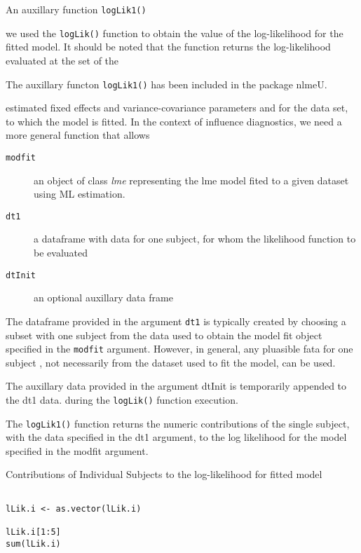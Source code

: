 \documentclass[a4paper,12pt]{article}
\begin{document}
An auxillary function \texttt{logLik1()}

we used the \texttt{logLik()} function to obtain the value of the log-likelihood for the fitted model.
It should be noted that the function returns the log-likelihood evaluated at the set of the


The auxillary functon \texttt{logLik1()} has been included in the package nlmeU.

estimated fixed effects and variance-covariance parameters and for the data set, to which the model
is fitted. In the context of influence diagnostics, we need a more general function that allows




\begin{description}
\item[ \texttt{modfit} ] an object of class \textit{lme} representing the lme model fited to a given dataset using ML estimation.
\item[ \texttt{dt1}] a dataframe with data for one subject, for whom the likelihood function to be evaluated
\item[ \texttt{dtInit }] an optional auxillary data frame
\end{description}


The dataframe provided in the argument \texttt{dt1} is typically created by choosing a subset with one subject from the data used to obtain the model fit object specified in the \texttt{modfit} argument.
However, in general, any pluasible fata for one subject , not necessarily from the dataset used to fit the model, can be used.


The auxillary data provided in the argument dtInit is temporarily appended to the dt1 data. during the \texttt{logLik()} function execution.



The \texttt{logLik1()} function returns the numeric contributions of the single subject, with the data specified in the dt1 argument, to the log likelihood
for the model specified in the modfit argument.



Contributions of Individual Subjects to the log-likelihood for fitted model


\begin{framed}
\begin{verbatim}

lLik.i <- as.vector(lLik.i)

lLik.i[1:5]
sum(lLik.i)

\end{verbatim}
\end{framed}
\end{document}
